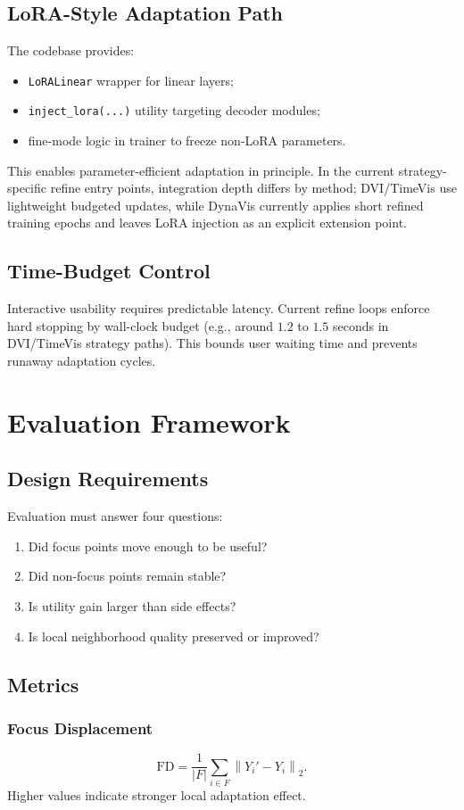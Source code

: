 \documentclass[12pt,a4paper]{report}
\begin{document}
\section{LoRA-Style Adaptation Path}
The codebase provides:
\begin{itemize}
\item \texttt{LoRALinear} wrapper for linear layers;
\item \texttt{inject\_lora(...)} utility targeting decoder modules;
\item fine-mode logic in trainer to freeze non-LoRA parameters.
\end{itemize}
This enables parameter-efficient adaptation in principle. In the current strategy-specific refine entry points, integration depth differs by method; DVI/TimeVis use lightweight budgeted updates, while DynaVis currently applies short refined training epochs and leaves LoRA injection as an explicit extension point.

\section{Time-Budget Control}
Interactive usability requires predictable latency. Current refine loops enforce hard stopping by wall-clock budget (e.g., around \(1.2\) to \(1.5\) seconds in DVI/TimeVis strategy paths). This bounds user waiting time and prevents runaway adaptation cycles.

\chapter{Evaluation Framework}
\section{Design Requirements}
Evaluation must answer four questions:
\begin{enumerate}
\item Did focus points move enough to be useful?
\item Did non-focus points remain stable?
\item Is utility gain larger than side effects?
\item Is local neighborhood quality preserved or improved?
\end{enumerate}

\section{Metrics}
\subsection{Focus Displacement}
\begin{equation}
\mathrm{FD} = \frac{1}{|F|}\sum_{i\in F}\left\|Y_i' - Y_i\right\|_2.
\end{equation}
Higher values indicate stronger local adaptation effect.
\end{document}
